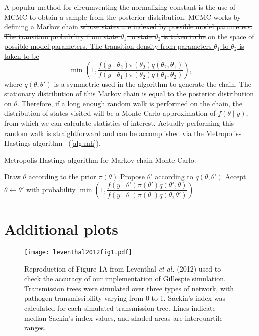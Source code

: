 A popular method for circumventing the normalizing constant is the use of
\gls{MCMC} to obtain a sample from the posterior distribution. \Gls{MCMC} works
by defining a Markov chain {\color{red}\sout{whose states are indexed by
possible model parameters. The transition probability from state $\theta_1$ to
state $\theta_2$ is taken to be}} {\color{blue}\uline{on the space of possible
model parameters. The transition density from parameters $\theta_1$ to
$\theta_2$ is taken to be}}
\[
  \min\left(1, \frac{f(y \mid \theta_2) \pi(\theta_2) q(\theta_2, \theta_1)}
                    {f(y \mid \theta_1) \pi(\theta_2) q(\theta_1, \theta_2)} \right),
\]
where $q(\theta, \theta')$ is a symmetric  used in
the algorithm to generate the chain. The stationary distribution of this Markov
chain is equal to the posterior distribution on $\theta$. Therefore, if a long
enough random walk is performed on the chain, the distribution of states
visited will be a Monte Carlo approximation of $f(\theta \mid y)$, from
which we can calculate statistics of interest. Actually performing this random
walk is straightforward and can be accomplished via the Metropolis-Hastings
algorithm~\autocite{metropolis1953equation,hastings1970monte} (\cref{alg:mh}).

\begin{algorithm}
  \caption{Metropolis-Hastings algorithm for Markov chain Monte Carlo.}
  \begin{algorithmic}
    \State Draw $\theta$ according to the prior $\pi(\theta)$
    \Loop
      \State Propose $\theta'$ according to $q(\theta, \theta')$
      \State Accept $\theta \gets \theta'$ with probability
      $\min \left( 1, 
       \dfrac{f(y \mid \theta') \pi(\theta') q(\theta', \theta)}
             {f(y \mid \theta\phantom{'}) \pi(\theta\phantom{'}) q(\theta, \theta')}
       \right)$
    \EndLoop
  \end{algorithmic}
  \label{alg:mh}
\end{algorithm}


\chapter{Additional plots}

\begin{figure}[ht]
  \centering
  \texttt{[image: leventhal2012fig1.pdf]}
  \caption[
    Reproduction of Figure 1A from Leventhal \textit{et al.} (2012) used to
    check the accuracy of our implementation of Gillespie simulation.
  ]{
    Reproduction of Figure 1A from Leventhal \textit{et al.} (2012) used to
    check the accuracy of our implementation of Gillespie simulation.
    Transmission trees were simulated over three types of network, with
    pathogen transmissibility varying from 0 to 1. Sackin's index was
    calculated for each simulated transmission tree. Lines indicate median
    Sackin's index values, and shaded areas are interquartile ranges.
  }
  \label{fig:leventhal}
\end{figure}

